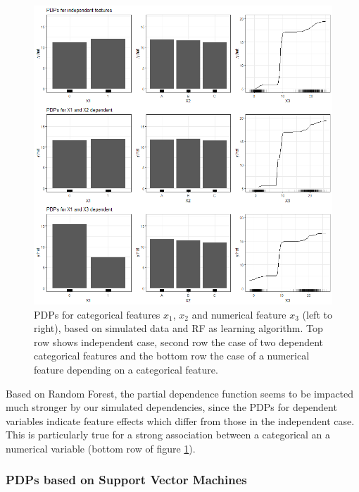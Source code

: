 \documentclass[
]{krantz}
\begin{document}
\begin{figure}

\includegraphics[width=1\linewidth]{images/VK_PDP_23_Set4_RF} \hfill{}

\caption{PDPs for categorical features $x_1$, $x_2$ and numerical feature $x_3$ (left to right), based on simulated data and RF as learning algorithm. Top row shows independent case, second row the case of two dependent categorical features and the bottom row the case of a numerical feature depending on a categorical feature.}\label{fig:Figure23}
\end{figure}

Based on Random Forest, the partial dependence function seems to be impacted much stronger by our simulated dependencies, since the PDPs for dependent variables indicate feature effects which differ from those in the independent case. This is particularly true for a strong association between a categorical an a numerical variable (bottom row of figure \ref{fig:Figure23}).

\hypertarget{pdps-based-on-support-vector-machines-3}{%
\subsubsection{PDPs based on Support Vector Machines}\label{pdps-based-on-support-vector-machines-3}}
\end{document}
